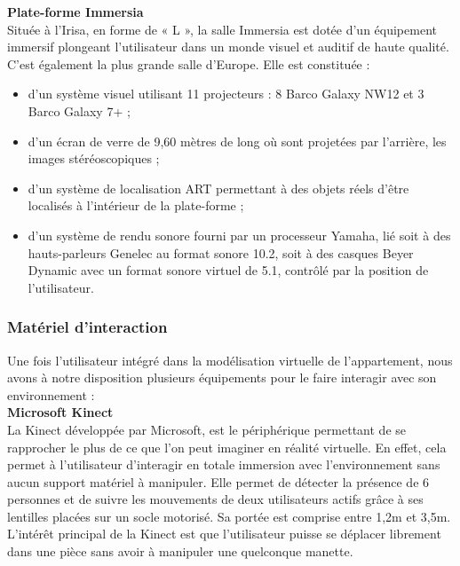 \textbf{Plate-forme Immersia}
\\

Située à l'Irisa, en forme de « L », la salle Immersia est dotée d'un équipement immersif plongeant l'utilisateur dans un monde visuel et auditif de haute qualité. C'est également la plus grande salle d'Europe.
Elle est constituée  :
\begin{itemize}
  \item d'un système visuel utilisant 11 projecteurs : 8 Barco Galaxy NW12 et 3 Barco Galaxy 7+ ;
  \item d'un écran de verre de 9,60 mètres de long où sont projetées par l'arrière, les images stéréoscopiques ;
  \item d'un système de localisation ART permettant à des objets réels d'être localisés à l'intérieur de la plate-forme ;
  \item d'un système de rendu sonore fourni par un processeur Yamaha, lié soit à des hauts-parleurs Genelec au format sonore 10.2, soit à des casques Beyer Dynamic avec un format sonore virtuel de 5.1, contrôlé par la position de l'utilisateur.
\end{itemize}

\subsubsection{Matériel d'interaction}
Une fois l'utilisateur intégré dans la modélisation virtuelle de l'appartement, nous avons à notre disposition plusieurs équipements pour le faire interagir avec son environnement :
\\

\textbf{Microsoft Kinect}
\\
La Kinect développée par Microsoft, est le périphérique permettant de se rapprocher le plus de ce que l'on peut imaginer en réalité virtuelle. En effet, cela permet à l'utilisateur d'interagir en totale immersion avec l'environnement sans aucun support matériel à manipuler. Elle permet de détecter la présence de 6 personnes et de suivre les mouvements de deux utilisateurs actifs grâce à ses lentilles placées sur un socle motorisé. Sa portée est comprise entre 1,2m et 3,5m. L'intérêt principal de la Kinect est que l'utilisateur puisse se déplacer librement dans une pièce sans avoir à manipuler une quelconque manette.
\\


